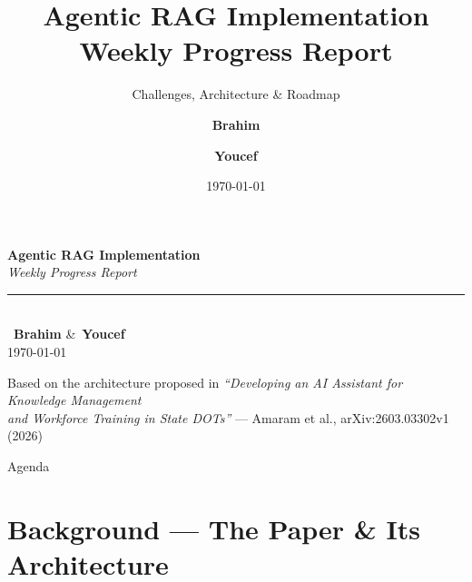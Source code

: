 \documentclass[aspectratio=169]{beamer}
\title[Agentic RAG — Weekly Report]{\textbf{Agentic RAG Implementation}\\Weekly Progress Report}
\subtitle{Challenges, Architecture \& Roadmap}
\author[Brahim \& Youcef]{\textbf{Brahim} \and \textbf{Youcef}}
\date{\today}
\institute{Research \& Development Team}
\begin{document}
{
\begin{frame}[plain]
  \vspace{1.2cm}
  \begin{center}
    {\Huge\textbf{Agentic RAG Implementation}}\\[0.3cm]
    {\large\textit{Weekly Progress Report}}\\[0.5cm]
    \rule{8cm}{0.4pt}\\[0.4cm]
    {\large \faUser\ \textbf{Brahim} \quad\&\quad \faUser\ \textbf{Youcef}}\\[0.3cm]
    {\small \today}
  \end{center}
  \vfill
  \begin{block}{}
    \centering\small
    Based on the architecture proposed in \emph{``Developing an AI Assistant for Knowledge Management\\
    and Workforce Training in State DOTs''} — Amaram et al., arXiv:2603.03302v1 (2026)
  \end{block}
\end{frame}
}

\begin{frame}{Agenda}
  \tableofcontents
\end{frame}

\section{Background — The Paper \& Its Architecture}
\end{document}
